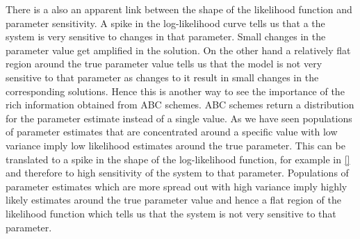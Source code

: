 \documentclass[12pt,a4paper,titlepage]{article}
\begin{document}
There is a also an apparent link between the shape of the likelihood function and parameter sensitivity. A spike in the log-likelihood curve tells us that a the system is very sensitive to changes in that parameter. Small changes in the parameter value get amplified in the solution. On the other hand a relatively flat region around the true parameter value tells us that the model is not very sensitive to that parameter as changes to it result in small changes in the corresponding solutions. Hence this is another way to see the importance of the rich information obtained from ABC schemes. ABC schemes return a distribution for the parameter estimate instead of a single value. As we have seen populations of parameter estimates that are concentrated around a specific value with low variance imply low likelihood estimates around the true parameter. This can be translated to a spike in the shape of the log-likelihood function, for example in \ref{} and therefore to high sensitivity of the system to that parameter. Populations of parameter estimates which are more spread out with high variance imply highly likely estimates around the true parameter value and hence a flat region of the likelihood function which tells us that the system is not very sensitive to that parameter.
\end{document}

